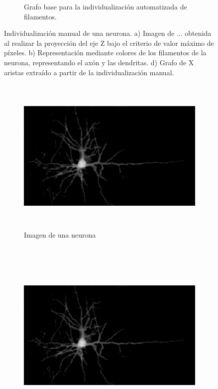 \begin{figure}[h!]
\begin{subfigure}[t]{0.33\textwidth}
        \caption{Grafo base para la individualizaci\'on automatizada de filamentos.}
        \label{fig:Porta6-4a1-graph}
    \end{subfigure}
    \caption{Individualizaci\'on manual de una neurona. a) Imagen de ... obtenida al realizar la proyecci\'on del eje Z bajo el criterio de valor m\'aximo de p\'ixeles. b) Representaci\'on mediante colores de los filamentos de la neurona, representando el ax\'on y las dendritas. d) Grafo de X aristas extra\'ido a partir de la individualizaci\'on manual.}
    \label{fig:Porta6-4a1}
\end{figure}

\begin{figure}[h!]
    \centering
    \begin{subfigure}[t]{0.33\textwidth}
        \centering
        \includegraphics[height=3in]{benchImages/grupo1-Porta10-5b-AVG-partialCleaned.png}
        \caption{Imagen de una neurona}
        \label{fig:Porta10-5b-og}
    \end{subfigure}
    ~ 
    \begin{subfigure}[t]{0.33\textwidth}
        \centering
        \includegraphics[height=3in]{benchImages/grupo1-Porta10-5b-AVG-partialCleaned.png}

\end{subfigure}
\end{figure}

